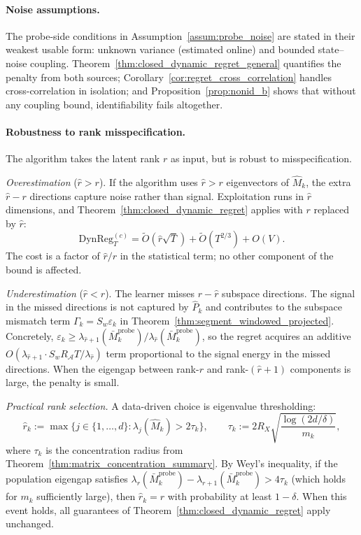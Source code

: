 \documentclass{article}
\newcommand{\cA}{\mathcal{A}}
\newcommand{\DynReg}{\mathrm{DynReg}}
\begin{document}
\paragraph{Noise assumptions.}
The probe-side conditions in Assumption~\ref{assum:probe_noise} are stated in their weakest usable form: unknown variance (estimated online) and bounded state--noise coupling. Theorem~\ref{thm:closed_dynamic_regret_general} quantifies the penalty from both sources; Corollary~\ref{cor:regret_cross_correlation} handles cross-correlation in isolation; and Proposition~\ref{prop:nonid_b} shows that without any coupling bound, identifiability fails altogether.



 \paragraph{Robustness to rank misspecification.}
  The algorithm takes the latent rank $r$ as input, but is robust to misspecification.

  \emph{Overestimation} ($\hat r > r$).
  If the algorithm uses $\hat r > r$ eigenvectors of $\widehat M_k$,
  the extra $\hat r - r$ directions capture noise rather than signal.
  Exploitation runs in $\hat r$ dimensions, and
  Theorem~\ref{thm:closed_dynamic_regret} applies with $r$ replaced
  by $\hat r$:
  \[
  \DynReg_T^{(c)}
  = \widetilde O(\hat r\sqrt{T}) + \widetilde O(T^{2/3}) + O(V).
  \]
  The cost is a factor of $\hat r / r$ in the statistical term;
  no other component of the bound is affected.

  \emph{Underestimation} ($\hat r < r$).
  The learner misses $r - \hat r$ subspace directions.  The signal
  in the missed directions is not captured by $\widehat P_k$ and
  contributes to the subspace mismatch term $\Gamma_k = S_w \varepsilon_k$
  in Theorem~\ref{thm:segment_windowed_projected}.  Concretely,
  $\varepsilon_k \ge \lambda_{\hat r+1}(\bar M_k^{\mathrm{probe}})
  / \lambda_{\hat r}(\bar M_k^{\mathrm{probe}})$, so the regret acquires
  an additive $O(\lambda_{\hat r+1} \cdot S_w R_{\cA} T / \lambda_{\hat r})$
  term proportional to the signal energy in the missed directions.
  When the eigengap between rank-$r$ and rank-$(\hat r{+}1)$ components
  is large, the penalty is small.

  \emph{Practical rank selection.}
  A data-driven choice is eigenvalue thresholding:
  \begin{equation}
  \label{eq:rank_selection}
  \hat r_k := \max\!\bigl\{j \in \{1,\ldots,d\} :
    \lambda_j(\widehat M_k) > 2\tau_k\bigr\},
  \qquad
  \tau_k := 2R_X\sqrt{\frac{\log(2d/\delta)}{m_k}},
  \end{equation}
  where $\tau_k$ is the concentration radius from
  Theorem~\ref{thm:matrix_concentration_summary}.
  By Weyl's inequality, if the population eigengap satisfies
  $\lambda_r(\bar M_k^{\mathrm{probe}}) - \lambda_{r+1}(\bar M_k^{\mathrm{probe}})
  > 4\tau_k$ (which holds for $m_k$ sufficiently large), then
  $\hat r_k = r$ with probability at least $1-\delta$.
  When this event holds, all guarantees of
  Theorem~\ref{thm:closed_dynamic_regret} apply unchanged.
\end{document}
